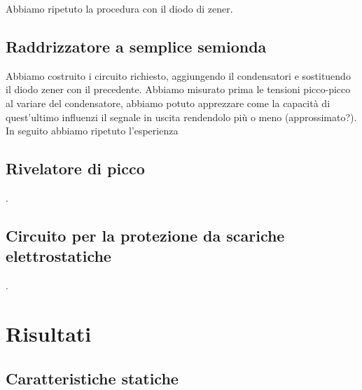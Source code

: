 \documentclass[a4paper]{article}
\begin{document}
			Abbiamo ripetuto la procedura con il diodo di zener.
		\subsection{Raddrizzatore a semplice semionda}
			Abbiamo costruito i circuito richiesto, aggiungendo il condensatori e sostituendo il diodo zener con il precedente.
			Abbiamo misurato prima le tensioni picco-picco al variare del condensatore, abbiamo potuto apprezzare come la capacità di quest'ultimo influenzi il segnale in uscita rendendolo più o meno (approssimato?).
			In seguito abbiamo ripetuto l'esperienza 
			
		\subsection{Rivelatore di picco}
			.
		\subsection{Circuito per la protezione da scariche elettrostatiche}
			.
	\section{Risultati}
		\subsection{Caratteristiche statiche}
\end{document}
